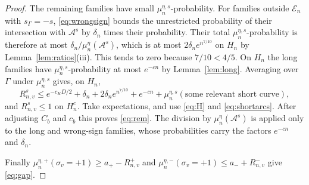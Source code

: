 \begin{proof}
The remaining families have small $\mu_n^{\eta,s}$-probability. For families outside $\mathcal E_n$ with $s_\Gamma=-s$, \eqref{eq:wrongsign} bounds the unrestricted probability of their intersection with $\mathcal A^s$ by $\delta_n$ times their probability. Their total $\mu_n^{\eta,s}$-probability is therefore at most $\delta_n/\mu_n^\eta(\mathcal A^s)$, which is at most $2\delta_ne^{n^{7/10}}$ on $H_n$ by Lemma~\ref{lem:ratios}(iii). This tends to zero because $7/10<4/5$. On $H_n$ the long families have $\mu_n^{\eta,s}$-probability at most $e^{-cn}$ by Lemma~\ref{lem:long}. Averaging over $\Gamma$ under $\mu_n^{\eta,s}$ gives, on $H_n$,
\[
 R_{n,v}^s\le e^{-c_KD/2}+\delta_n+2\delta_ne^{n^{7/10}}+e^{-cn}
 +\mu_n^{\eta,s}(\text{some relevant short curve}),
\]
and $R_{n,v}^s\le1$ on $H_n^c$. Take expectations, and use \eqref{eq:H} and \eqref{eq:shortarcs}. After adjusting $C_b$ and $c_b$ this proves \eqref{eq:rem}. The division by $\mu_n^\eta(\mathcal A^s)$ is applied only to the long and wrong-sign families, whose probabilities carry the factors $e^{-cn}$ and $\delta_n$.

Finally $\mu_n^{\eta,+}(\sigma_v=+1)\ge a_+-R_{n,v}^+$ and $\mu_n^{\eta,-}(\sigma_v=+1)\le a_-+R_{n,v}^-$ give \eqref{eq:gap}.
\end{proof}
